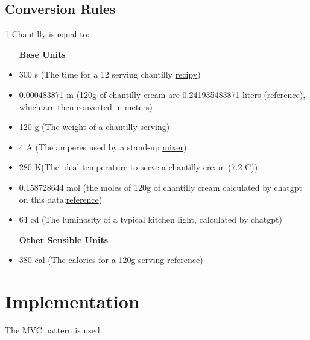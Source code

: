 \documentclass[12pt, a4paper]{report}
\begin{document}
\section{Conversion Rules}
1 Chantilly is equal to:
\begin{itemize}
    \item [\textbf{Base Units}]
    \item 300 s (The time for a 12 serving chantilly \href{https://www.thespruceeats.com/vanilla-chantilly-cream-recipe-1375640}{recipy})
    \item 0.000483871 m (120g of chantilly cream are 0.241935483871 liters (\href{https://www.inchcalculator.com/convert/gram-to-liter/}{reference}), which are then converted in meters)
    \item 120 g (The weight of a chantilly serving)
    \item 4 A (The amperes used by a stand-up \href{https://anationofmoms.com/2023/04/stand-up-mixer-amps.html}{mixer})
    \item 280 K\textdegree (The ideal temperature to serve a chantilly cream (7.2 C\textdegree))
    \item 0.158728644 mol (the moles of 120g of chantilly cream calculated by chatgpt on this data:\href{https://www.fatsecret.com/calories-nutrition/generic/chantilly-cream?portionid=49910&portionamount=100.000&frc=True}{reference})
    \item 64 cd (The luminosity of a typical kitchen light, calculated by chatgpt)
\end{itemize}
\begin{itemize}
    \item [\textbf{Other Sensible Units}]
    \item 380 cal (The calories for a 120g serving \href{https://www.fatsecret.com/calories-nutrition/generic/chantilly-cream?portionid=49910&portionamount=100.000&frc=True}{reference})
\end{itemize}

\chapter{Implementation}
The MVC pattern is used



\end{document}
